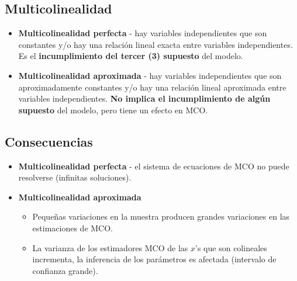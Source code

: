 \documentclass[10pt, a4paper, landscape]{extarticle}
\begin{document}
\begin{multicols}{3}
\section*{Multicolinealidad}
	\begin{itemize}[leftmargin=*]
		\item \textbf{Multicolinealidad perfecta} - hay variables independientes que son constantes y/o hay una relación lineal exacta entre variables independientes. Es el \textbf{incumplimiento del tercer (3) supuesto} del modelo.
		\item \textbf{Multicolinealidad aproximada} - hay variables independientes que son aproximadamente constantes y/o hay una relación lineal aproximada entre variables independientes. \textbf{No implica el incumplimiento de algún supuesto} del modelo, pero tiene un efecto en MCO.
	\end{itemize}
	\subsection*{Consecuencias}
		\begin{itemize}[leftmargin=*]
			\item \textbf{Multicolinealidad perfecta} - el sistema de ecuaciones de MCO no puede resolverse (infinitas soluciones).
			\item \textbf{Multicolinealidad aproximada}
			\begin{itemize}[leftmargin=*]
				\item Pequeñas variaciones en la muestra producen grandes variaciones en las estimaciones de MCO.
				\item La varianza de los estimadores MCO de las $x$'s que son colineales incrementa, la inferencia de los parámetros es afectada (intervalo de confianza grande).
			\end{itemize}
		\end{itemize}

\end{multicols}
\end{document}
